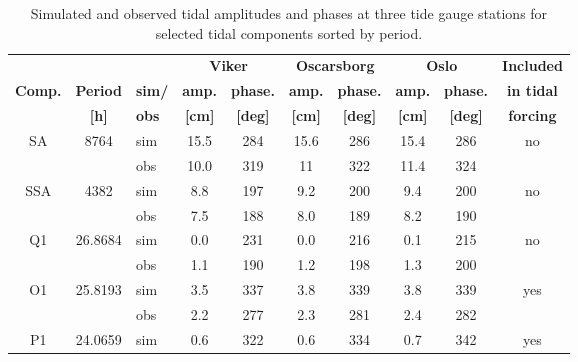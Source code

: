 \begin{table}[htb] 
	\caption{\small Simulated and observed tidal amplitudes and phases at three tide gauge stations for selected tidal components sorted by period.} 
	\label{tab:Tide} 
	\centering 
	\begin{tabular}{|c|c|l|cc|cc|cc|c|} 
\hline  
	  &	&	& \multicolumn{2}{|c|}{\small \bf Viker} & \multicolumn{2}{|c|}{\small \bf Oscarsborg} & \multicolumn{2}{|c|}{\small \bf Oslo} & {\small \bf Included} \\  
{\small \bf Comp.} & {\small \bf Period} & {\small \bf sim/} & {\small \bf amp.} & {\small \bf phase.} & {\small \bf amp.} & {\small \bf phase.} & {\small \bf amp.} & {\small \bf phase.} & {\small \bf in tidal} \\ 
	    & {\small \bf [h]} & {\small \bf obs} & {\small \bf [cm]} & {\small \bf [deg]} & {\small \bf [cm]} & {\small \bf [deg]} & {\small \bf [cm]}   & {\small \bf [deg]} & {\small \bf forcing} \\ \hline 
\small SA   & \small 8764    & \small sim & \small 15.5 & \small 284 & \small 15.6 & \small 286 & \small 15.4 & \small 286 & \small no  \\
\small      &        	     & \small obs & \small 10.0 & \small 319 & \small 11   & \small 322 & \small 11.4 & \small 324 &    	\\
\hline
\small SSA  & \small 4382    & \small sim & \small 8.8  & \small 197 & \small 9.2  & \small 200 & \small 9.4  & \small 200 & \small no  \\
\small      &		     & \small obs & \small 7.5  & \small 188 & \small 8.0  & \small 189 & \small 8.2  & \small 190 &    	\\
\hline
\small Q1   & \small 26.8684 & \small sim & \small 0.0  & \small 231 & \small 0.0  & \small 216 & \small 0.1  & \small 215 & \small no	\\
\small      &        	     & \small obs & \small 1.1  & \small 190 & \small 1.2  & \small 198 & \small 1.3  & \small 200 &    	\\
\hline
\small O1   & \small 25.8193 & \small sim & \small 3.5  & \small 337 & \small 3.8  & \small 339 & \small 3.8  & \small 339 & \small yes	\\
\small      &        	     & \small obs & \small 2.2  & \small 277 & \small 2.3  & \small 281 & \small 2.4  & \small 282 &    	\\
\hline
\small P1   & \small 24.0659 & \small sim & \small 0.6  & \small 322 & \small 0.6  & \small 334 & \small 0.7  & \small 342 & \small yes	\\

\end{tabular}
\end{table}
